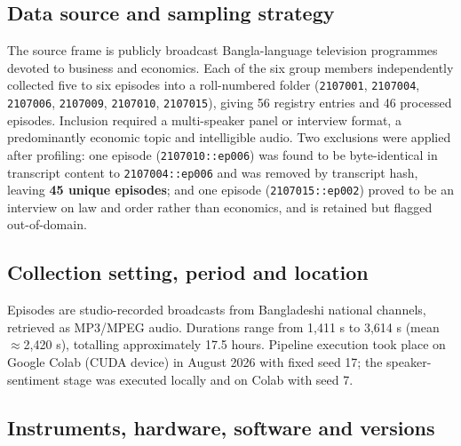 \documentclass[11pt,a4paper]{article}
\begin{document}
\vspace{4pt}

\subsection{Data source and sampling strategy}

The source frame is publicly broadcast Bangla-language television programmes devoted to business
and economics. Each of the six group members independently collected five to six episodes into a
roll-numbered folder (\texttt{2107001}, \texttt{2107004}, \texttt{2107006}, \texttt{2107009},
\texttt{2107010}, \texttt{2107015}), giving 56 registry entries and 46 processed episodes.
Inclusion required a multi-speaker panel or interview format, a predominantly economic topic and
intelligible audio. Two exclusions were applied after profiling: one episode
(\texttt{2107010::ep006}) was found to be byte-identical in transcript content to
\texttt{2107004::ep006} and was removed by transcript hash, leaving \textbf{45 unique episodes};
and one episode (\texttt{2107015::ep002}) proved to be an interview on law and order rather than
economics, and is retained but flagged out-of-domain.

\subsection{Collection setting, period and location}

Episodes are studio-recorded broadcasts from Bangladeshi national channels, retrieved as
MP3/MPEG audio. Durations range from 1{,}411 s to 3{,}614 s (mean $\approx$2{,}420 s), totalling
approximately 17.5 hours. Pipeline execution took place on Google Colab (CUDA device) in
August 2026 with fixed seed 17; the speaker-sentiment stage was executed locally and on Colab
with seed 7.

\subsection{Instruments, hardware, software and versions}
\end{document}
